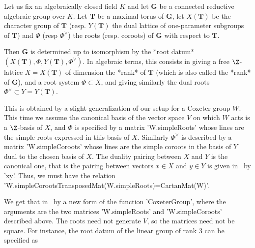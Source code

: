 \newcommand\bG{{\mathbf G}}
\newcommand\bH{{\mathbf H}}
\newcommand\bS{{\mathbf S}}
\newcommand\bT{{\mathbf T}}

Let  us fix an algebraically closed field  $K$ and let $\bG$ be a connected
reductive  algebraic group over $K$. Let $\bT$ be a maximal torus of $\bG$,
let  $X(\bT)$  be  the  character  group  of $\bT$ (resp. $Y(\bT)$ the dual
lattice  of one-parameter subgroups of $\bT$) and $\Phi$ (resp $\Phi^\vee$)
the roots (resp. coroots) of $\bG$ with respect to $\bT$.

Then   $\bG$  is  determined   up  to  isomorphism   by  the  *root  datum*
$(X(\bT),\Phi,  Y(\bT),\Phi^\vee)$.  In  algebraic  terms, this consists in
giving  a free  $\Z$-lattice $X=X(\bT)$  of dimension  the *rank*  of $\bT$
(which is also called the *rank* of $\bG$), and a root system $\Phi \subset
X$, and giving similarly the dual roots $\Phi^\vee\subset Y=Y(\bT)$.

This  is obtained  by a  slight generalization  of our  setup for a Coxeter
group  $W$. This time we assume the canonical basis of the vector space $V$
on  which $W$  acts is  a $\Z$-basis  of $X$,  and $\Phi$ is specified by a
matrix  'W.simpleRoots' whose lines are the  simple roots expressed in this
basis   of   $X$.   Similarly   $\Phi^\vee$   is   described  by  a  matrix
'W.simpleCoroots'  whose lines are  the simple coroots  in the basis of $Y$
dual to the chosen basis of $X$. The duality pairing between $X$ and $Y$ is
the  canonical one, that is the pairing  between vectors $x\in X$ and $y\in
Y$  is  given  in  \GAP\  by  'x\*y'.  Thus,  we  must  have  the  relation
'W.simpleCoroots\*TransposedMat(W.simpleRoots)=CartanMat(W)'.

We get that in \CHEVIE\ by a new form of the function 'CoxeterGroup', where
the  arguments are  the two  matrices 'W.simpleRoots' and 'W.simpleCoroots'
described  above. The roots need not generate $V$, so the matrices need not
be  square. For instance, the root datum of  the linear group of rank 3 can
be specified as\:

